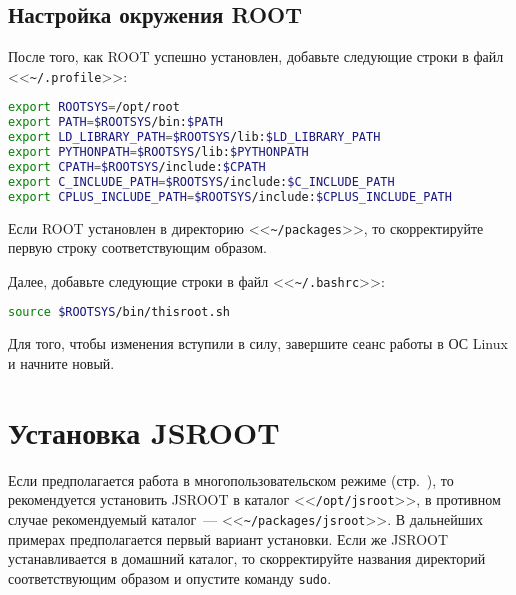 \documentclass[12pt, a4paper, oneside, onecolumn]{book}
\newcommand{\ROOT}{\mbox{ROOT}}
\newcommand{\ROOTJS}{\mbox{JSROOT}}
\newcommand{\APP}[1]{\mbox{\tt #1}}
\newcommand{\DIRECTORY}[1]{<<{\tt #1}>>}
\newcommand{\FILE}[1]{<<{\tt #1}>>}
\begin{document}
\subsection{Настройка окружения \ROOT{}}

После того, как \ROOT{} успешно установлен, добавьте следующие строки в файл \FILE{\~{}/.profile}:

\begin{lstlisting}[language=bash]
export ROOTSYS=/opt/root
export PATH=$ROOTSYS/bin:$PATH
export LD_LIBRARY_PATH=$ROOTSYS/lib:$LD_LIBRARY_PATH
export PYTHONPATH=$ROOTSYS/lib:$PYTHONPATH
export CPATH=$ROOTSYS/include:$CPATH
export C_INCLUDE_PATH=$ROOTSYS/include:$C_INCLUDE_PATH
export CPLUS_INCLUDE_PATH=$ROOTSYS/include:$CPLUS_INCLUDE_PATH
\end{lstlisting}

Если \ROOT{} установлен в директорию \DIRECTORY{\~{}/packages}, то скорректируйте первую строку соответствующим образом.

Далее, добавьте следующие строки в файл \FILE{\~{}/.bashrc}:

\begin{lstlisting}[language=bash]
source $ROOTSYS/bin/thisroot.sh
\end{lstlisting}

Для того, чтобы изменения вступили в силу, завершите сеанс работы в ОС Linux и начните новый.

\section{Установка \ROOTJS{}}

Если предполагается работа в многопользовательском режиме (стр.~\pageref{sec_multiuser}), то рекомендуется установить \ROOTJS{} в каталог \DIRECTORY{/opt/jsroot}, в противном случае рекомендуемый каталог~--- \DIRECTORY{\~{}/packages/jsroot}. В дальнейших примерах предполагается первый вариант установки. Если же \ROOTJS{} устанавливается в домашний каталог, то скорректируйте названия директорий соответствующим образом и опустите команду \APP{sudo}.
\end{document}
